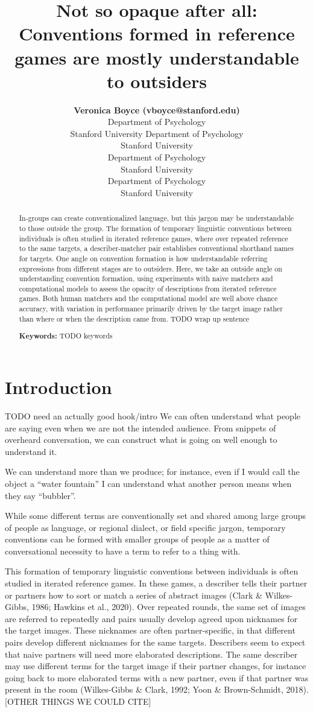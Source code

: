 \documentclass[10pt, letterpaper]{article}
\title{Not so opaque after all: Conventions formed in reference games
are mostly understandable to outsiders}
\author{{\large \bf Veronica Boyce (vboyce@stanford.edu)} \\ Department of Psychology \\ Stanford University \And {\large \bf Ben Prystawski (benpry@stanford.edu)} Department of Psychology \\ Stanford University \AND {\large \bf Alvin Wei Ming Tan (tanawm@stanford.edu)} \\ Department of Psychology \\ Stanford University \And {\large \bf Michael C. Frank (mcfrank@stanford.edu)} \\ Department of Psychology \\ Stanford University}
\begin{document}
\maketitle

\begin{abstract}
In-groups can create conventionalized language, but this jargon may be
understandable to those outside the group. The formation of temporary
linguistic conventions between individuals is often studied in iterated
reference games, where over repeated reference to the same targets, a
describer-matcher pair establishes conventional shorthand names for
targets. One angle on convention formation is how understandable
referring expressions from different stages are to outsiders. Here, we
take an outside angle on understanding convention formation, using
experiments with naive matchers and computational models to assess the
opacity of descriptions from iterated reference games. Both human
matchers and the computational model are well above chance accuracy,
with variation in performance primarily driven by the target image
rather than where or when the description came from. TODO wrap up
sentence

\textbf{Keywords:}
TODO keywords
\end{abstract}

\section{Introduction}\label{introduction}

TODO need an actually good hook/intro We can often understand what
people are saying even when we are not the intended audience. From
snippets of overheard conversation, we can construct what is going on
well enough to understand it.

We can understand more than we produce; for instance, even if I would
call the object a ``water fountain'' I can understand what another
person means when they say ``bubbler''.

While some different terms are conventionally set and shared among large
groups of people as language, or regional dialect, or field specific
jargon, temporary conventions can be formed with smaller groups of
people as a matter of conversational necessity to have a term to refer
to a thing with.

This formation of temporary linguistic conventions between individuals
is often studied in iterated reference games. In these games, a
describer tells their partner or partners how to sort or match a series
of abstract images (Clark \& Wilkes-Gibbs, 1986; Hawkins et al., 2020).
Over repeated rounds, the same set of images are referred to repeatedly
and pairs usually develop agreed upon nicknames for the target images.
These nicknames are often partner-specific, in that different pairs
develop different nicknames for the same targets. Describers seem to
expect that naive partners will need more elaborated descriptions. The
same describer may use different terms for the target image if their
partner changes, for instance going back to more elaborated terms with a
new partner, even if that partner was present in the room (Wilkes-Gibbs
\& Clark, 1992; Yoon \& Brown-Schmidt, 2018). {[}OTHER THINGS WE COULD
CITE{]}
\end{document}
